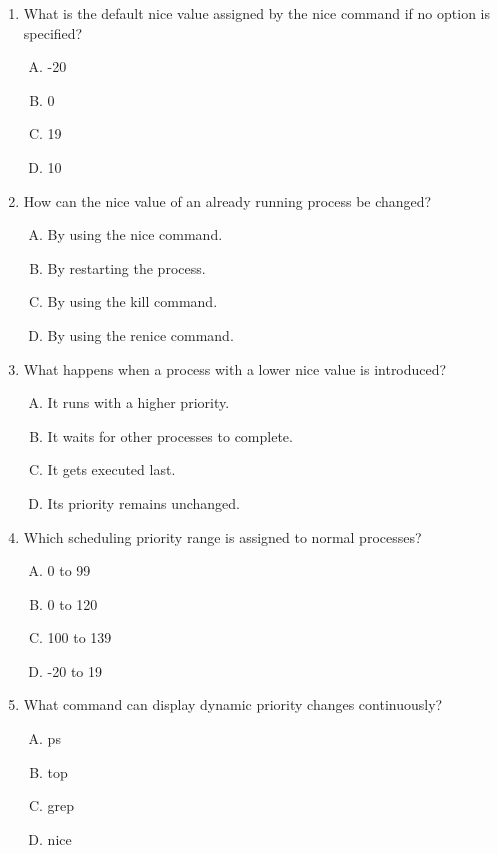 \documentclass[a4paper]{report}
\begin{document}
\begin{enumerate}[1.]
    \item What is the default nice value assigned by the nice command if no option is specified?  
    \begin{enumerate}[A)]
        \item -20  
        \item 0  
        \item 19  
        \item 10  
    \end{enumerate}

    \item How can the nice value of an already running process be changed?  
    \begin{enumerate}[A)]
        \item By using the nice command.  
        \item By restarting the process.  
        \item By using the kill command.  
        \item By using the renice command.  
    \end{enumerate}

    \item What happens when a process with a lower nice value is introduced?  
    \begin{enumerate}[A)]
        \item It runs with a higher priority.  
        \item It waits for other processes to complete.  
        \item It gets executed last.  
        \item Its priority remains unchanged.  
    \end{enumerate}

    \item Which scheduling priority range is assigned to normal processes?  
    \begin{enumerate}[A)]
        \item 0 to 99  
        \item 0 to 120  
        \item 100 to 139  
        \item -20 to 19  
    \end{enumerate}

    \item What command can display dynamic priority changes continuously?  
    \begin{enumerate}[A)]
        \item ps  
        \item top  
        \item grep  
        \item nice  
    \end{enumerate}


\end{enumerate}
\end{document}
